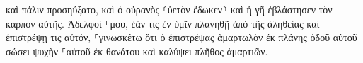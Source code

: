\documentclass{openreader}
\begin{document}
καὶ πάλιν προσηύξατο, καὶ ὁ οὐρανὸς ⸂ὑετὸν ἔδωκεν⸃ καὶ ἡ γῆ ἐβλάστησεν τὸν καρπὸν αὐτῆς. 
Ἀδελφοί ⸀μου, ἐάν τις ἐν ὑμῖν πλανηθῇ ἀπὸ τῆς ἀληθείας καὶ ἐπιστρέψῃ τις αὐτόν, 
⸀γινωσκέτω ὅτι ὁ ἐπιστρέψας ἁμαρτωλὸν ἐκ πλάνης ὁδοῦ αὐτοῦ σώσει ψυχὴν ⸀αὐτοῦ ἐκ θανάτου καὶ καλύψει πλῆθος ἁμαρτιῶν. 
\end{document}
